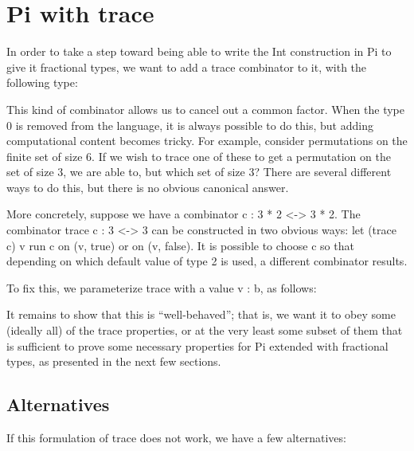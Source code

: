 \documentclass{sigplanconf}
\begin{document}
\section{ {{Pi}} with trace}

In order to take a step toward being able to write the Int construction in
{{Pi}} to give it fractional types, we want to add a trace combinator to it,
with the following type:


This kind of combinator allows us to cancel out a common factor. When the type
{{0}} is removed from the language, it is always possible to do this, but adding
computational content becomes tricky. For example, consider permutations on the
finite set of size {{6}}. If we wish to trace one of these to get a permutation
on the set of size {{3}}, we are able to, but which set of size {{3}}? There
are several different ways to do this, but there is no obvious canonical answer.

More concretely, suppose we have a combinator {{c : 3 * 2 <-> 3 * 2}}. The
combinator {{trace c : 3 <-> 3}} can be constructed in two obvious ways: let
{{(trace c) v}} run {{c}} on {{(v, true)}} or on {{(v, false)}}. It is possible
to choose {{c}} so that depending on which default value of type {{2}} is used,
a different combinator results.

To fix this, we parameterize {{trace}} with a value {{v : b}}, as follows:


It remains to show that this is ``well-behaved''; that is, we want it to obey
some (ideally all) of the trace properties, or at the very least some subset of
them that is sufficient to prove some necessary properties for {{Pi}} extended
with fractional types, as presented in the next few sections.

\subsection{Alternatives}

If this formulation of trace does not work, we have a few alternatives:
\end{document}
